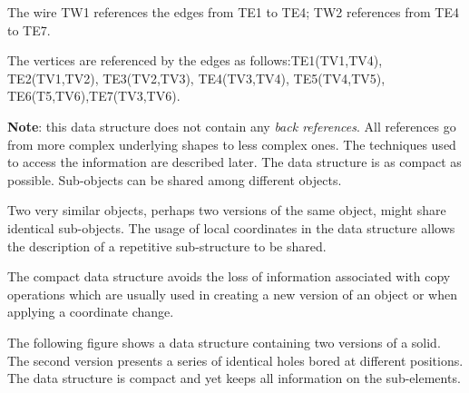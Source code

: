 The wire T\+W1 references the edges from T\+E1 to T\+E4; T\+W2 references from T\+E4 to T\+E7.

The vertices are referenced by the edges as follows\+:T\+E1(\+T\+V1,\+T\+V4), T\+E2(\+T\+V1,\+T\+V2), T\+E3(\+T\+V2,\+T\+V3), T\+E4(\+T\+V3,\+T\+V4), T\+E5(\+T\+V4,\+T\+V5), T\+E6(\+T5,\+T\+V6),T\+E7(\+T\+V3,\+T\+V6).

{\bfseries Note}\+: this data structure does not contain any {\itshape back references}. All references go from more complex underlying shapes to less complex ones. The techniques used to access the information are described later. The data structure is as compact as possible. Sub-\/objects can be shared among different objects.

Two very similar objects, perhaps two versions of the same object, might share identical sub-\/objects. The usage of local coordinates in the data structure allows the description of a repetitive sub-\/structure to be shared.

The compact data structure avoids the loss of information associated with copy operations which are usually used in creating a new version of an object or when applying a coordinate change.

The following figure shows a data structure containing two versions of a solid. The second version presents a series of identical holes bored at different positions. The data structure is compact and yet keeps all information on the sub-\/elements.

